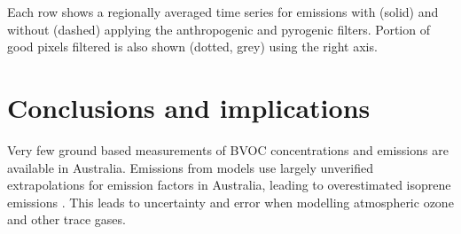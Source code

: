       Each row shows a regionally averaged time series for emissions with (solid) and without (dashed) applying the anthropogenic and pyrogenic filters.
      Portion of good pixels filtered is also shown (dotted, grey) using the right axis.
      
    
    
\section{Conclusions and implications}
  \label{BioIsop:conclusions}
  
  
  
  Very few ground based measurements of BVOC concentrations and emissions are available in Australia.
  Emissions from models use largely unverified extrapolations for emission factors in Australia, leading to overestimated isoprene emissions \parencite{Emmerson2016}.
  This leads to uncertainty and error when modelling atmospheric ozone and other trace gases.
  

